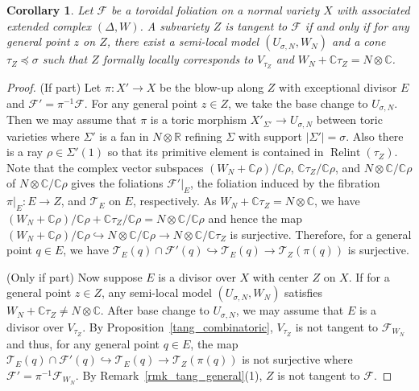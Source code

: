 \documentclass[12pt,reqno]{amsart}
\newtheorem{corollary}[theorem]{Corollary}
\theoremstyle{definition}
\newcommand{\on}{\operatorname}
\newcommand\cF{{\mathcal{F}}}
\newcommand\cT{{\mathcal{T}}}
\newcommand\bC{{\mathbb C}}
\newcommand\bR{{\mathbb R}}
\begin{document}
\begin{corollary}
    Let $\cF$ be a toroidal foliation on a normal variety $X$ with associated extended complex $(\Delta,W)$. 
    A subvariety $Z$ is tangent to $\cF$ if and only if for any general point $z$ on $Z$, there exist a semi-local model $(U_{\sigma,N},W_N)$ and a cone $\tau_Z\preceq\sigma$ such that $Z$ formally locally corresponds to $V_{\tau_Z}$ and $W_N+\bC\tau_Z = N\otimes\bC$. 
\end{corollary}
\begin{proof}
    (If part) Let $\pi\colon X'\to X$ be the blow-up along $Z$ with exceptional divisor $E$ and $\cF'=\pi^{-1}\cF$. 
    For any general point $z\in Z$, we take the base change to $U_{\sigma,N}$. 
    Then we may assume that $\pi$ is a toric morphism $X'_{\Sigma'}\to U_{\sigma,N}$ between toric varieties where $\Sigma'$ is a fan in $N\otimes\bR$ refining $\Sigma$ with support $|\Sigma'|=\sigma$. 
    Also there is a ray $\rho\in\Sigma'(1)$ so that its primitive element is contained in $\on{Relint}(\tau_Z)$. 
    Note that the complex vector subspaces $(W_N+\bC\rho)/\bC\rho$, $\bC\tau_Z/\bC\rho$, and $N\otimes\bC/\bC\rho$ of $N\otimes\bC/\bC\rho$ gives the foliations $\cF'\vert_E$, the foliation induced by the fibration $\pi\vert_E\colon E\to Z$, and $\cT_E$ on $E$, respectively. 
    As $W_N+\bC\tau_Z = N\otimes\bC$, we have $(W_N+\bC\rho)/\bC\rho + \bC\tau_Z/\bC\rho = N\otimes\bC/\bC\rho$ and hence the map $(W_N+\bC\rho)/\bC\rho \hookrightarrow N\otimes\bC/\bC\rho \to N\otimes\bC/\bC\tau_Z$ is surjective. 
    Therefore, for a general point $q\in E$, we have $\cT_E(q)\cap\cF'(q)\hookrightarrow\cT_E(q)\to \cT_Z(\pi(q))$ is surjective. 

    (Only if part) Now suppose $E$ is a divisor over $X$ with center $Z$ on $X$. 
    If for a general point $z\in Z$, any semi-local model $(U_{\sigma,N},W_N)$ satisfies $W_N+\bC\tau_Z\neq N\otimes\bC$. 
    After base change to $U_{\sigma,N}$, we may assume that $E$ is a divisor over $V_{\tau_Z}$. 
    By Proposition~\ref{tang_combinatoric}, $V_{\tau_Z}$ is not tangent to $\cF_{W_N}$ and thus, for any general point $q\in E$, the map $\cT_E(q)\cap\cF'(q)\hookrightarrow\cT_E(q)\to\cT_Z(\pi(q))$ is not surjective where $\cF'=\pi^{-1}\cF_{W_N}$. 
    By Remark~\ref{rmk_tang_general}(1), $Z$ is not tangent to $\cF$. 
\end{proof}
\end{document}
